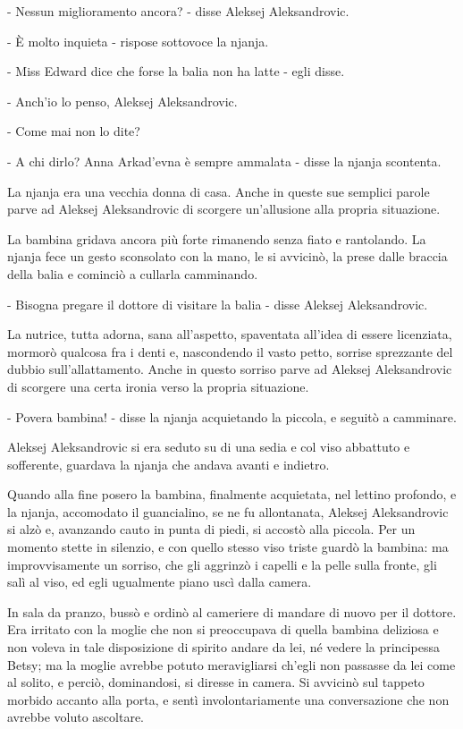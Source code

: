 - Nessun miglioramento ancora? - disse Aleksej Aleksandrovic. 

- È molto inquieta - rispose sottovoce la njanja. 

- Miss Edward dice che forse la balia non ha latte - egli disse. 

- Anch'io lo penso, Aleksej Aleksandrovic. 

- Come mai non lo dite? 

- A chi dirlo? Anna Arkad'evna è sempre ammalata - disse la njanja scontenta. 

La njanja era una vecchia donna di casa. Anche in queste sue semplici parole parve ad Aleksej Aleksandrovic di scorgere un'allusione alla propria situazione. 

La bambina gridava ancora più forte rimanendo senza fiato e rantolando. La njanja fece un gesto sconsolato con la mano, le si avvicinò, la prese dalle braccia della balia e cominciò a cullarla camminando. 

- Bisogna pregare il dottore di visitare la balia - disse Aleksej Aleksandrovic. 

La nutrice, tutta adorna, sana all'aspetto, spaventata all'idea di essere licenziata, mormorò qualcosa fra i denti e, nascondendo il vasto petto, sorrise sprezzante del dubbio sull'allattamento. Anche in questo sorriso parve ad Aleksej Aleksandrovic di scorgere una certa ironia verso la propria situazione. 

- Povera bambina! - disse la njanja acquietando la piccola, e seguitò a camminare. 

Aleksej Aleksandrovic si era seduto su di una sedia e col viso abbattuto e sofferente, guardava la njanja che andava avanti e indietro. 

Quando alla fine posero la bambina, finalmente acquietata, nel lettino profondo, e la njanja, accomodato il guancialino, se ne fu allontanata, Aleksej Aleksandrovic si alzò e, avanzando cauto in punta di piedi, si accostò alla piccola. Per un momento stette in silenzio, e con quello stesso viso triste guardò la bambina: ma improvvisamente un sorriso, che gli aggrinzò i capelli e la pelle sulla fronte, gli salì al viso, ed egli ugualmente piano uscì dalla camera. 

In sala da pranzo, bussò e ordinò al cameriere di mandare di nuovo per il dottore. Era irritato con la moglie che non si preoccupava di quella bambina deliziosa e non voleva in tale disposizione di spirito andare da lei, né vedere la principessa Betsy; ma la moglie avrebbe potuto meravigliarsi ch'egli non passasse da lei come al solito, e perciò, dominandosi, si diresse in camera. Si avvicinò sul tappeto morbido accanto alla porta, e sentì involontariamente una conversazione che non avrebbe voluto ascoltare. 

